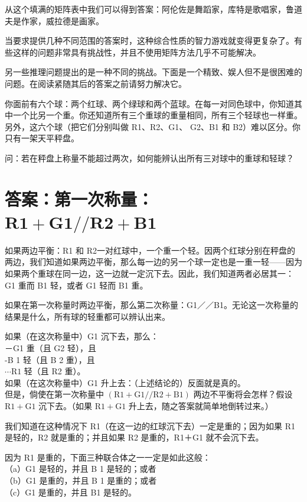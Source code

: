 从这个填满的矩阵表中我们可以得到答案：阿伦佐是舞蹈家，库特是歌唱家，鲁道夫是作家，威拉德是画家。

当要求提供几种不同范围的答案时，这种综合性质的智力游戏就变得更复杂了。有些这样的问题非常具有挑战性，并且不使用矩阵方法几乎不可能解决。

另一些推理问题提出的是一种不同的挑战。下面是一个精致、娱人但不是很困难的问题。在阅读紧随其后的答案之前请努力解决它。

你面前有六个球：两个红球、两个绿球和两个蓝球。在每一对同色球中，你知道其中一个比另一个重。你还知道所有三个重球的重量相同，所有三个轻球也一样重。另外，这六个球（把它们分别叫做 R1、R2、G1、 G2、B1 和 B2）难以区分。你只有一架天平秤盘。

问：若在秤盘上称量不能超过两次，如何能辨认出所有三对球中的重球和轻球？

\section*{答案：第一次称量： $\mathbf{R 1 + G 1 / / R 2 + B 1}$}
如果两边平衡：R1 和 R2一对红球中，一个重一个轻。因两个红球分别在秤盘的两边，我们知道如果两边平衡，那么每一边的另一个球一定也是一重一轻——因为如果两个重球在同一边，这一边就一定沉下去。因此，我们知道两者必居其一：G1 重而 B1 轻，或者 G1 轻而 B1 重。

如果在第一次称量时两边平衡，那么第二次称量：G1／／B1。无论这一次称量的结果是什么，所有球的轻重都可以辨认出来。

如果（在这次称量中）G1 沉下去，那么：\\
－G1 重（且 G2 轻），且\\
-B 1 轻（且 B 2 重），且\\
$\cdots \mathrm{R} 1$ 轻（且 R2 重）。\\
如果（在这次称量中）G1 升上去：（上述结论的）反面就是真的。\\
但是，倘使在第一次称量中 $(\mathrm{R} 1+\mathrm{G} 1 / / \mathrm{R} 2+\mathrm{B} 1)$ 两边不平衡将会怎样？假设 $\mathrm{R} 1+\mathrm{G} 1$ 沉下去。（如果 $\mathrm{R} 1+\mathrm{G} 1$ 升上去，随之答案就简单地倒转过来。）

我们知道在这种情况下 R1（在这一边的红球沉下去）一定是重的；因为如果 R1 是轻的，R2 就是重的；并且如果 R2 是重的，R1＋G1 就不会沉下去。

因为 R1 是重的，下面三种联合体之一一定是如此这般：\\
（a）G1 是轻的，并且 B 1 是轻的；或者\\
（b）G1 是重的，并且 B 1 是重的；或者\\
（c）G1 是重的，并且 B1 是轻的。

